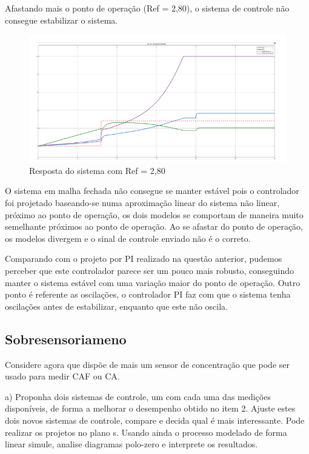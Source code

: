 \documentclass[a4paper,12pt]{article}
\begin{document}
Afastando mais o ponto de operação (Ref = 2,80), o sistema de controle não consegue estabilizar o sistema.

\begin{figure}[H]
    \centering
    \includegraphics[width=0.8\linewidth]{image11.png}
    \caption{ Resposta do sistema com Ref = 2,80}
    
\end{figure}

O sistema em malha fechada não consegue se manter estável pois o controlador foi projetado baseando-se numa aproximação linear do sistema não linear, próximo ao ponto de operação, os dois modelos se comportam de maneira muito semelhante próximos ao ponto
de operação. Ao se afastar do ponto de operação, os modelos divergem e o sinal de controle enviado não é o correto. 

Comparando com o projeto por PI realizado na questão anterior, pudemos perceber que este controlador parece ser um pouco mais robusto, conseguindo manter o sistema estável com uma variação maior do ponto de operação. Outro ponto é referente as oscilações, o controlador PI faz com que o sistema tenha oscilações antes de estabilizar, enquanto que este não oscila.

\newpage
\subsection{Sobresensoriameno}

Considere agora que dispõe de mais um sensor de concentração que pode ser usado 
para medir CAF ou CA.

a) Proponha dois sistemas de controle, um com cada uma das medições disponíveis, 
de forma a melhorar o desempenho obtido no item 2. Ajuste estes dois novos 
sistemas de controle, compare e decida qual é mais interessante. Pode realizar os 
projetos no plano s. Usando ainda o processo modelado de forma linear simule, 
analise diagramas polo-zero e interprete os resultados.
\end{document}
